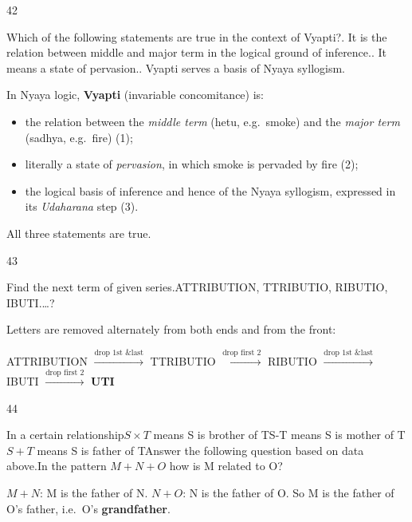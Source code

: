 \begin{question}{42}
{Which of the following statements are true in the context of Vyapti?. It is the relation between middle and major term in the logical ground of inference.. It means a state of pervasion.. Vyapti serves a basis of Nyaya syllogism.\par}
\begin{explain}
In Nyaya logic, \textbf{Vyapti} (invariable concomitance) is:
\begin{itemize}
\item the relation between the \emph{middle term} (hetu, e.g.\ smoke) and the \emph{major term} (sadhya, e.g.\ fire) (1);
\item literally a state of \emph{pervasion}, in which smoke is pervaded by fire (2);
\item the logical basis of inference and hence of the Nyaya syllogism, expressed in its \emph{Udaharana} step (3).
\end{itemize}
All three statements are true.
\end{explain}
\end{question}

\begin{question}{43}
{Find the next term of given series.\newline ATTRIBUTION, TTRIBUTIO, RIBUTIO, IBUTI.\ldots{}?\par}
\begin{explain}
Letters are removed alternately from both ends and from the front:
\begin{center}
ATTRIBUTION $\xrightarrow{\text{drop 1st \& last}}$ TTRIBUTIO $\xrightarrow{\text{drop first 2}}$ RIBUTIO $\xrightarrow{\text{drop 1st \& last}}$ IBUTI $\xrightarrow{\text{drop first 2}}$ \textbf{UTI}
\end{center}
\end{explain}
\end{question}

\begin{question}{44}
{In a certain relationship\newline $S\times T$ means S is brother of T\newline S-T means S is mother of T\newline $S+T$ means S is father of T\newline Answer the following question based on data above.\newline In the pattern $M+N+O$ how is M related to O?\par}
\begin{explain}
$M+N$: M is the father of N. $N+O$: N is the father of O. So M is the father of O's father, i.e.\ O's \textbf{grandfather}.
\end{explain}
\end{question}

